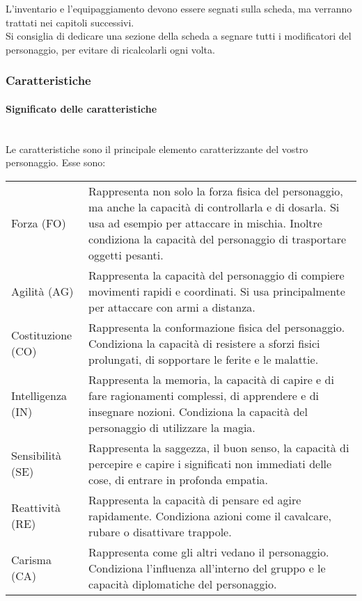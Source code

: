\documentclass[../manuale_main.tex]{subfiles}
\begin{document}
L'inventario e l'equipaggiamento devono essere segnati sulla scheda, ma verranno trattati nei capitoli successivi.\\
Si consiglia di dedicare una sezione della scheda a segnare tutti i modificatori del personaggio, per evitare di ricalcolarli ogni volta.

\subsubsection{Caratteristiche}

\paragraph{Significato delle caratteristiche}\mbox{}\\
Le caratteristiche sono il principale elemento caratterizzante del vostro personaggio. Esse sono:

\begin{center}
\renewcommand{\arraystretch}{1.2}
\begin{tabularx}{\linewidth}{ l X }
Forza (FO) &Rappresenta non solo la forza fisica del personaggio, ma anche la capacità di controllarla e di dosarla. Si usa ad esempio per attaccare in mischia. Inoltre condiziona la capacità del personaggio di trasportare oggetti pesanti.\\

Agilità (AG)&Rappresenta la capacità del personaggio di compiere movimenti rapidi e coordinati. Si usa principalmente per attaccare con armi a distanza.\\

Costituzione (CO)&Rappresenta la conformazione fisica del personaggio. Condiziona la capacità di resistere a sforzi fisici prolungati, di sopportare le ferite e le malattie.\\

Intelligenza (IN)&Rappresenta la memoria, la capacità di capire e di fare ragionamenti complessi, di apprendere e di insegnare nozioni. Condiziona la capacità del personaggio di utilizzare la magia.\\

Sensibilità (SE)&Rappresenta la saggezza, il buon senso, la capacità di percepire e capire i significati non immediati delle cose, di entrare in profonda empatia.\\

Reattività (RE)&Rappresenta la capacità di pensare ed agire rapidamente. Condiziona azioni come il cavalcare, rubare o disattivare trappole.\\

Carisma (CA)& Rappresenta come gli altri vedano il personaggio. Condiziona l'influenza all'interno del gruppo e le capacità diplomatiche del personaggio.\\
\end{tabularx}
\end{center}
\end{document}
